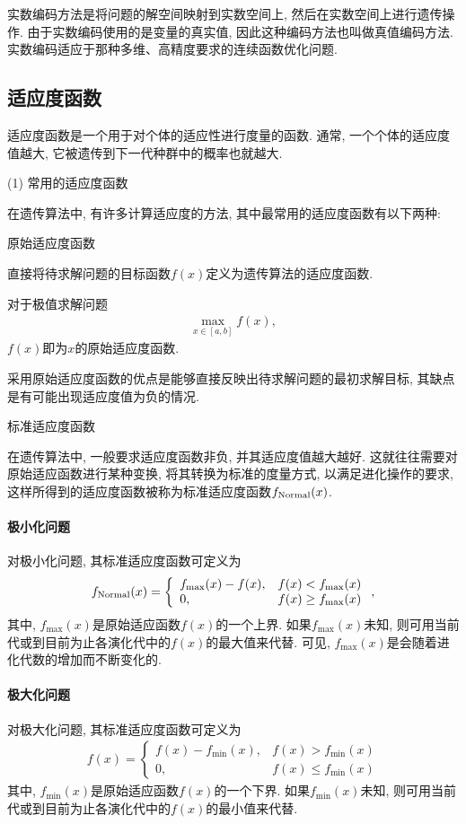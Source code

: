 实数编码方法是将问题的解空间映射到实数空间上, 然后在实数空间上进行遗传操作.
由于实数编码使用的是变量的真实值, 因此这种编码方法也叫做真值编码方法.
实数编码适应于那种多维、高精度要求的连续函数优化问题.
\subsection{适应度函数}
适应度函数是一个用于对个体的适应性进行度量的函数. 通常, 一个个体的适应度值越大, 它被遗传到下一代种群中的概率也就越大.

(1) 常用的适应度函数

在遗传算法中, 有许多计算适应度的方法, 其中最常用的适应度函数有以下两种:

 原始适应度函数

直接将待求解问题的目标函数$f(x)$定义为遗传算法的适应度函数.

\begin{example}
    对于极值求解问题
\begin{align}
    \max _{x \in[a, b]} f(x),
\end{align}
$f(x)$即为$x$的原始适应度函数.
\end{example}

采用原始适应度函数的优点是能够直接反映出待求解问题的最初求解目标, 其缺点是有可能出现适应度值为负的情况.

 标准适应度函数

在遗传算法中, 一般要求适应度函数非负, 并其适应度值越大越好. 这就往往需要对原始适应函数进行某种变换, 将其转换为标准的度量方式, 以满足进化操作的要求, 这样所得到的适应度函数被称为标准适应度函数$f_{\textup{Normal}}(x)$.
\paragraph{极小化问题}
对极小化问题, 其标准适应度函数可定义为
\begin{align}
f_{\textup{Normal}}(x)=
\left\{\begin{array}{ll}
{f_{\max }(x)-f(x)}, &f(x)<f_{\max}(x) \\
{0}, & f(x)\geq f_{\max }(x)
\end{array}
\right.,
\end{align}
其中, $f_{\max}(x)$是原始适应函数$f(x)$的一个上界. 如果$f_{\max}(x)$未知, 则可用当前代或到目前为止各演化代中的$f(x)$的最大值来代替. 可见, $f_{\max}(x)$是会随着进化代数的增加而不断变化的.
\paragraph{极大化问题}
对极大化问题, 其标准适应度函数可定义为
\begin{align}
  f(x)=\left\{
  \begin{array}{ll}
  f(x)-f_{\min }(x), &f(x)>f_{\min}(x)\\
 0, & f(x)\leq f_{\min}(x)
  \end{array}
  \right.
\end{align}
其中, $f_{\min}(x)$是原始适应函数$f(x)$的一个下界. 如果$f_{\min}(x)$未知, 则可用当前代或到目前为止各演化代中的$f(x)$的最小值来代替.

